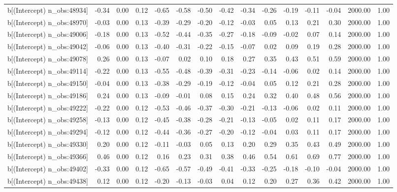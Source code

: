 \begin{table}[ht]
\begin{tabular}{rrrrrrrrrrrrrrr}
  b[(Intercept) n\_obs:48934] & -0.34 & 0.00 & 0.12 & -0.65 & -0.58 & -0.50 & -0.42 & -0.34 & -0.26 & -0.19 & -0.11 & -0.04 & 2000.00 & 1.00 \\ 
  b[(Intercept) n\_obs:48970] & -0.03 & 0.00 & 0.13 & -0.39 & -0.29 & -0.20 & -0.12 & -0.03 & 0.05 & 0.13 & 0.21 & 0.30 & 2000.00 & 1.00 \\ 
  b[(Intercept) n\_obs:49006] & -0.18 & 0.00 & 0.13 & -0.52 & -0.44 & -0.35 & -0.27 & -0.18 & -0.09 & -0.02 & 0.07 & 0.14 & 2000.00 & 1.00 \\ 
  b[(Intercept) n\_obs:49042] & -0.06 & 0.00 & 0.13 & -0.40 & -0.31 & -0.22 & -0.15 & -0.07 & 0.02 & 0.09 & 0.19 & 0.28 & 2000.00 & 1.00 \\ 
  b[(Intercept) n\_obs:49078] & 0.26 & 0.00 & 0.13 & -0.07 & 0.02 & 0.10 & 0.18 & 0.27 & 0.35 & 0.43 & 0.51 & 0.59 & 2000.00 & 1.00 \\ 
  b[(Intercept) n\_obs:49114] & -0.22 & 0.00 & 0.13 & -0.55 & -0.48 & -0.39 & -0.31 & -0.23 & -0.14 & -0.06 & 0.02 & 0.14 & 2000.00 & 1.00 \\ 
  b[(Intercept) n\_obs:49150] & -0.04 & 0.00 & 0.13 & -0.38 & -0.29 & -0.19 & -0.12 & -0.04 & 0.05 & 0.12 & 0.21 & 0.28 & 2000.00 & 1.00 \\ 
  b[(Intercept) n\_obs:49186] & 0.24 & 0.00 & 0.13 & -0.09 & -0.01 & 0.08 & 0.15 & 0.24 & 0.32 & 0.40 & 0.48 & 0.56 & 2000.00 & 1.00 \\ 
  b[(Intercept) n\_obs:49222] & -0.22 & 0.00 & 0.12 & -0.53 & -0.46 & -0.37 & -0.30 & -0.21 & -0.13 & -0.06 & 0.02 & 0.11 & 2000.00 & 1.00 \\ 
  b[(Intercept) n\_obs:49258] & -0.13 & 0.00 & 0.12 & -0.45 & -0.38 & -0.28 & -0.21 & -0.13 & -0.05 & 0.02 & 0.11 & 0.17 & 2000.00 & 1.00 \\ 
  b[(Intercept) n\_obs:49294] & -0.12 & 0.00 & 0.12 & -0.44 & -0.36 & -0.27 & -0.20 & -0.12 & -0.04 & 0.03 & 0.11 & 0.17 & 2000.00 & 1.00 \\ 
  b[(Intercept) n\_obs:49330] & 0.20 & 0.00 & 0.12 & -0.11 & -0.03 & 0.05 & 0.13 & 0.20 & 0.29 & 0.35 & 0.43 & 0.49 & 2000.00 & 1.00 \\ 
  b[(Intercept) n\_obs:49366] & 0.46 & 0.00 & 0.12 & 0.16 & 0.23 & 0.31 & 0.38 & 0.46 & 0.54 & 0.61 & 0.69 & 0.77 & 2000.00 & 1.00 \\ 
  b[(Intercept) n\_obs:49402] & -0.33 & 0.00 & 0.12 & -0.65 & -0.57 & -0.49 & -0.41 & -0.33 & -0.25 & -0.18 & -0.10 & -0.04 & 2000.00 & 1.00 \\ 
  b[(Intercept) n\_obs:49438] & 0.12 & 0.00 & 0.12 & -0.20 & -0.13 & -0.03 & 0.04 & 0.12 & 0.20 & 0.27 & 0.36 & 0.42 & 2000.00 & 1.00 \\ 

\end{tabular}
\end{table}
